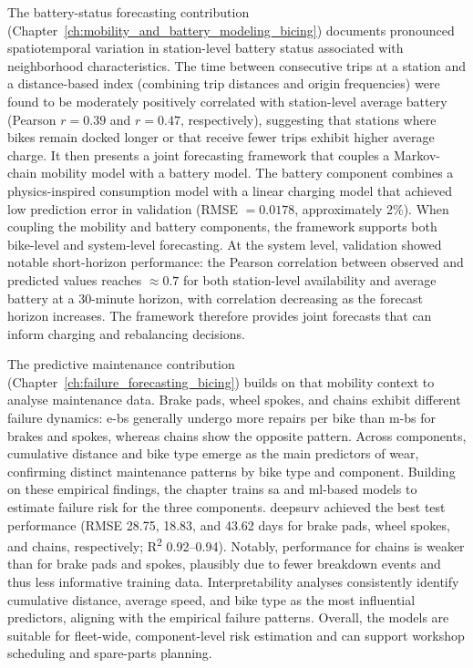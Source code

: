 The battery-status forecasting contribution (Chapter~\ref{ch:mobility_and_battery_modeling_bicing}) documents pronounced spatiotemporal variation in station-level battery status associated with neighborhood characteristics. The time between consecutive trips at a station and a distance-based index (combining trip distances and origin frequencies) were found to be moderately positively correlated with station-level average battery (Pearson $r=0.39$ and $r=0.47$, respectively), suggesting that stations where bikes remain docked longer or that receive fewer trips exhibit higher average charge. It then presents a joint forecasting framework that couples a Markov-chain mobility model with a battery model. The battery component combines a physics-inspired consumption model with a linear charging model that achieved low prediction error in validation (RMSE $=0.0178$, approximately 2\%). When coupling the mobility and battery components, the framework supports both bike-level and system-level forecasting. At the system level, validation showed notable short-horizon performance: the Pearson correlation between observed and predicted values reaches $\approx 0.7$ for both station-level availability and average battery at a 30-minute horizon, with correlation decreasing as the forecast horizon increases. The framework therefore provides joint forecasts that can inform charging and rebalancing decisions.

The predictive maintenance contribution (Chapter~\ref{ch:failure_forecasting_bicing}) builds on that mobility context to analyse maintenance data. Brake pads, wheel spokes, and chains exhibit different failure dynamics: \acp{e-b} generally undergo more repairs per bike than \acp{m-b} for brakes and spokes, whereas chains show the opposite pattern. Across components, cumulative distance and bike type emerge as the main predictors of wear, confirming distinct maintenance patterns by bike type and component. Building on these empirical findings, the chapter trains \ac{sa} and \ac{ml}-based models to estimate failure risk for the three components. \ac{deepsurv} achieved the best test performance (RMSE 28.75, 18.83, and 43.62 days for brake pads, wheel spokes, and chains, respectively; \mbox{R\textsuperscript{2}} 0.92--0.94). Notably, performance for chains is weaker than for brake pads and spokes, plausibly due to fewer breakdown events and thus less informative training data. Interpretability analyses consistently identify cumulative distance, average speed, and bike type as the most influential predictors, aligning with the empirical failure patterns. Overall, the models are suitable for fleet-wide, component-level risk estimation and can support workshop scheduling and spare-parts planning.